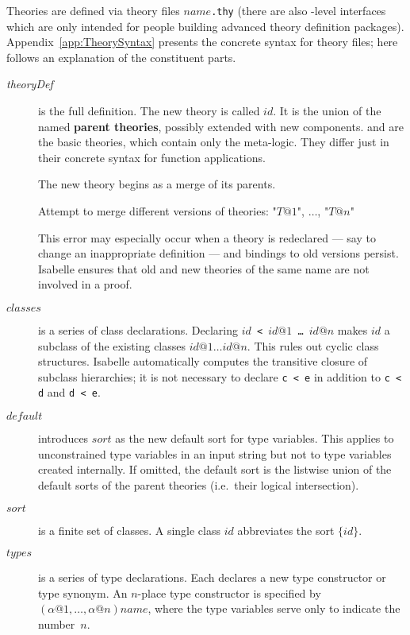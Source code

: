 Theories are defined via theory files $name$\texttt{.thy} (there are also
\ML-level interfaces which are only intended for people building advanced
theory definition packages).  Appendix~\ref{app:TheorySyntax} presents the
concrete syntax for theory files; here follows an explanation of the
constituent parts.
\begin{description}
\item[{\it theoryDef}] is the full definition.  The new theory is called $id$.
  It is the union of the named {\bf parent
    theories}, possibly extended with new
  components.   and  are the basic theories, which
  contain only the meta-logic.  They differ just in their concrete syntax for
  function applications.
  
  The new theory begins as a merge of its parents.
  \begin{ttbox}
    Attempt to merge different versions of theories: "\(T@1\)", \(\ldots\), "\(T@n\)"
  \end{ttbox}
  This error may especially occur when a theory is redeclared --- say to
  change an inappropriate definition --- and bindings to old versions persist.
  Isabelle ensures that old and new theories of the same name are not involved
  in a proof.

\item[$classes$]
  is a series of class declarations.  Declaring {\tt$id$ < $id@1$ \dots\
    $id@n$} makes $id$ a subclass of the existing classes $id@1\dots
  id@n$.  This rules out cyclic class structures.  Isabelle automatically
  computes the transitive closure of subclass hierarchies; it is not
  necessary to declare \texttt{c < e} in addition to \texttt{c < d} and \texttt{d <
    e}.

\item[$default$]
  introduces $sort$ as the new default sort for type variables.  This applies
  to unconstrained type variables in an input string but not to type
  variables created internally.  If omitted, the default sort is the listwise
  union of the default sorts of the parent theories (i.e.\ their logical
  intersection).
  
\item[$sort$] is a finite set of classes.  A single class $id$ abbreviates the
  sort $\{id\}$.

\item[$types$]
  is a series of type declarations.  Each declares a new type constructor
  or type synonym.  An $n$-place type constructor is specified by
  $(\alpha@1,\dots,\alpha@n)name$, where the type variables serve only to
  indicate the number~$n$.


\end{description}
